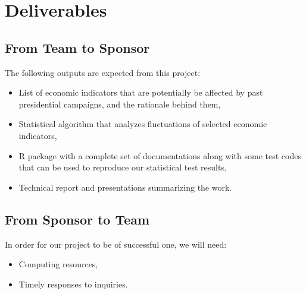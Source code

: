 \documentclass[12pt,letterpaper]{article}
\theoremstyle{definition}
\begin{document}
\section{Deliverables}
\subsection{From Team to Sponsor} %
The following outputs are expected from this project:
\begin{itemize}
    \item List of economic indicators that are potentially be affected by past presidential campaigns, and the rationale behind them,
    \item Statistical algorithm that analyzes fluctuations of selected economic indicators,
    \item R package with a complete set of documentations along with some test codes that can be used to reproduce our statistical test results,
    \item Technical report and presentations summarizing the work. 
\end{itemize}

\subsection{From Sponsor to Team} %

In order for our project to be of successful one, we will need:
\begin{itemize}

    \item Computing resources,
    \item Timely responses to inquiries.

\end{itemize}


\newpage


\end{document}
